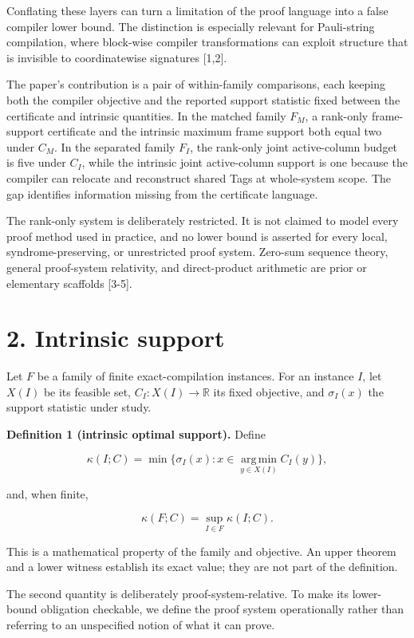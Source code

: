 \documentclass[11pt]{article}
\begin{document}
Conflating these layers can turn a limitation of the proof language into a false compiler lower bound. The distinction is especially relevant for Pauli-string compilation, where block-wise compiler transformations can exploit structure that is invisible to coordinatewise signatures {[}1,2{]}.

The paper's contribution is a pair of within-family comparisons, each keeping both the compiler objective and the reported support statistic fixed between the certificate and intrinsic quantities. In the matched family \(F_M\), a rank-only frame-support certificate and the intrinsic maximum frame support both equal two under \(C_M\). In the separated family \(F_I\), the rank-only joint active-column budget is five under \(C_I\), while the intrinsic joint active-column support is one because the compiler can relocate and reconstruct shared Tags at whole-system scope. The gap identifies information missing from the certificate language.

The rank-only system is deliberately restricted. It is not claimed to model every proof method used in practice, and no lower bound is asserted for every local, syndrome-preserving, or unrestricted proof system. Zero-sum sequence theory, general proof-system relativity, and direct-product arithmetic are prior or elementary scaffolds {[}3-5{]}.

\hypertarget{intrinsic-support}{%
\section*{2. Intrinsic support}\label{intrinsic-support}}

Let \(F\) be a family of finite exact-compilation instances. For an instance \(I\), let \(X(I)\) be its feasible set, \(C_I:X(I)\to\mathbb{R}\) its fixed objective, and \(\sigma_I(x)\) the support statistic under study.

\textbf{Definition 1 (intrinsic optimal support).} Define

\[
\kappa(I;C)
=
\min\{\sigma_I(x):x\in\operatorname*{arg\,min}_{y\in X(I)} C_I(y)\},
\]

and, when finite,

\[
\kappa(F;C)=\sup_{I\in F}\kappa(I;C).
\]

This is a mathematical property of the family and objective. An upper theorem and a lower witness establish its exact value; they are not part of the definition.

The second quantity is deliberately proof-system-relative. To make its lower-bound obligation checkable, we define the proof system operationally rather than referring to an unspecified notion of what it can prove.
\end{document}
